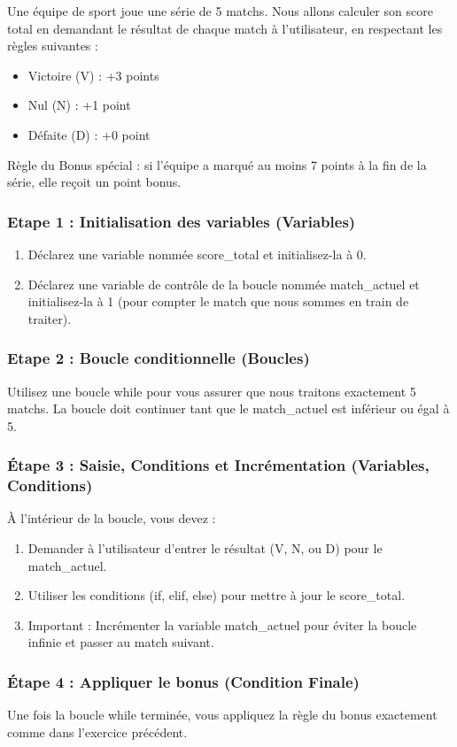 \begin{Exercise}[title={En autonomie (ou presque) : Calculateur de Points Séquentiel}]
Une équipe de sport joue une série de 5 matchs. Nous allons calculer son score total en demandant le résultat de chaque match à l'utilisateur, en respectant les règles suivantes :
\begin{itemize}
    \item Victoire (V) : +3 points
    \item Nul (N) : +1 point
    \item Défaite (D) : +0 point
\end{itemize}
Règle du Bonus spécial : si l'équipe a marqué au moins 7 points à la fin de la série, elle reçoit un point bonus.

\subsubsection*{Etape 1 : Initialisation des variables (Variables)}
\begin{enumerate}
    \item Déclarez une variable nommée score\_total et initialisez-la à 0.
    \item Déclarez une variable de contrôle de la boucle nommée match\_actuel et initialisez-la à 1 (pour compter le match que nous sommes en train de traiter).
\end{enumerate}

\subsubsection*{Etape 2 : Boucle conditionnelle (Boucles)}
Utilisez une boucle while pour vous assurer que nous traitons exactement 5 matchs. La boucle doit continuer tant que le match\_actuel est inférieur ou égal à 5.

\subsubsection*{Étape 3 : Saisie, Conditions et Incrémentation (Variables, Conditions)}
À l'intérieur de la boucle, vous devez :
\begin{enumerate}
    \item Demander à l'utilisateur d'entrer le résultat (V, N, ou D) pour le match\_actuel.
    \item Utiliser les conditions (if, elif, else) pour mettre à jour le score\_total.
    \item Important : Incrémenter la variable match\_actuel pour éviter la boucle infinie et passer au match suivant.
\end{enumerate}
\vspace{-1cm}
\subsubsection*{Étape 4 : Appliquer le bonus (Condition Finale)}
Une fois la boucle while terminée, vous appliquez la règle du bonus exactement comme dans l'exercice précédent.
\end{Exercise}


